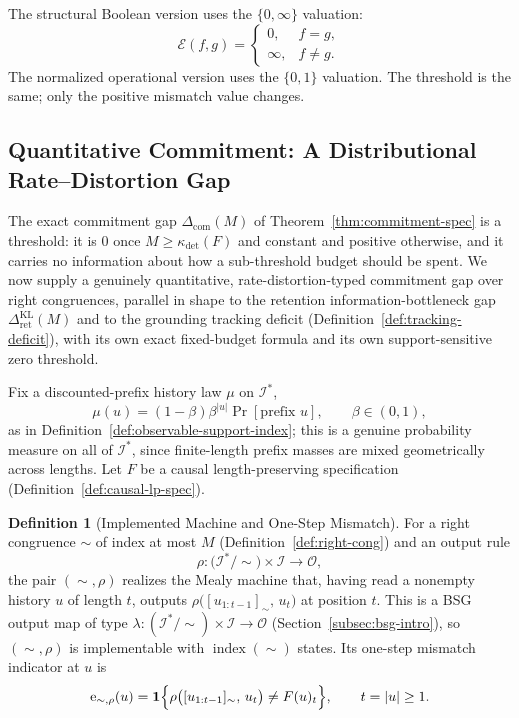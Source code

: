 \documentclass[12pt]{article}
\theoremstyle{definition}
\newtheorem{definition}[theorem]{Definition}
\newcommand{\RetKL}{\Delta_{\mathrm{ret}}^{\mathrm{KL}}}
\newcommand{\Com}{\Delta_{\mathrm{com}}}
\newcommand{\Comex}{\Com}
\begin{document}
The structural Boolean version uses the $\{0,\infty\}$ valuation:
\[
\mathcal E(f,g)=
\begin{cases}
0,&f=g,\\
\infty,&f\neq g.
\end{cases}
\]
The normalized operational version uses the $\{0,1\}$ valuation.  The threshold
is the same; only the positive mismatch value changes.

\subsection{Quantitative Commitment: A Distributional Rate--Distortion Gap}
\label{subsec:commitment-rd}

The exact commitment gap $\Comex(M)$ of Theorem~\ref{thm:commitment-spec} is
a threshold: it is $0$ once $M\ge\kappa_{\det}(F)$ and constant and positive
otherwise, and it carries no information about how a sub-threshold budget
should be spent.  We now supply a genuinely quantitative, rate-distortion-typed
commitment gap over right congruences, parallel in shape to the retention
information-bottleneck gap $\RetKL(M)$ and to the grounding tracking deficit
(Definition~\ref{def:tracking-deficit}), with its own exact fixed-budget
formula and its own support-sensitive zero threshold.

Fix a discounted-prefix history law $\mu$ on $\mathcal I^*$,
\[
\mu(u)=(1-\beta)\beta^{|u|}\Pr[\text{prefix }u],
\qquad \beta\in(0,1),
\]
as in Definition~\ref{def:observable-support-index}; this is a genuine
probability measure on all of $\mathcal I^*$, since finite-length prefix
masses are mixed geometrically across lengths.  Let $F$ be a causal
length-preserving specification (Definition~\ref{def:causal-lp-spec}).

\begin{definition}[Implemented Machine and One-Step Mismatch]
\label{def:com-rd-machine}
For a right congruence $\sim$ of index at most $M$
(Definition~\ref{def:right-cong}) and an output rule
\[
\rho:\bigl(\mathcal I^*/\!\sim\bigr)\times\mathcal I\to\mathcal O,
\]
the pair $(\sim,\rho)$ realizes the Mealy machine that, having read a
nonempty history $u$ of length $t$, outputs
$\rho\bigl([u_{1:t-1}]_\sim,\,u_t\bigr)$
at position $t$.  This is a BSG output map of type
$\lambda:(\mathcal I^*/\!\sim)\times\mathcal I\to\mathcal O$
(Section~\ref{subsec:bsg-intro}), so $(\sim,\rho)$ is implementable with
$\operatorname{index}(\sim)$ states.  Its one-step mismatch indicator at $u$
is
\[
\mathrm e_{\sim,\rho}(u)
=
\mathbf 1
\Bigl\{
\rho\bigl([u_{1:t-1}]_\sim,\,u_t\bigr)
\ne
F(u)_t
\Bigr\},
\qquad t=|u|\ge1.
\]
\end{definition}
\end{document}
